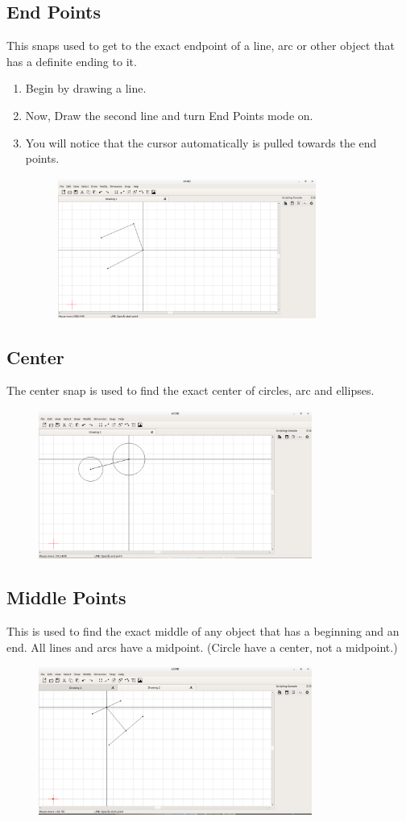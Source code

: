 \subsection{End Points}
This snaps used to get to the exact endpoint of a line, arc or other object that has a definite ending to it. 
\begin{enumerate}
\item Begin by drawing a line.
\item Now, Draw the second line and turn End Points mode on.
\item You will notice that the cursor automatically is pulled towards the end points.
\begin{figure}[h!]
\centering
\includegraphics[width=0.8\textwidth]{images/esnap.png}
\end{figure}
\end{enumerate}
\subsection{Center}
The center snap is used to find the exact center of circles, arc and ellipses.
\begin{figure}[h!]
\centering
\includegraphics[width=0.8\textwidth]{images/csnap.png}
\end{figure}
\subsection{Middle Points}
This is used to find the exact middle of any object that has a beginning and an end. All lines and arcs have a midpoint. (Circle have a center, not a midpoint.)
\begin{figure}[h!]
\centering
\includegraphics[width=0.8\textwidth]{images/msnap.png}
\end{figure}